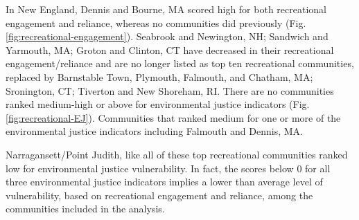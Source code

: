 \documentclass[
  10pt,
]{article}
\begin{document}
In New England, Dennis and Bourne, MA scored high for both recreational engagement and reliance, whereas no communities did previously (Fig. \ref{fig:recreational-engagement}). Seabrook and Newington, NH; Sandwich and Yarmouth, MA; Groton and Clinton, CT have decreased in their recreational engagement/reliance and are no longer listed as top ten recreational communities, replaced by Barnstable Town, Plymouth, Falmouth, and Chatham, MA; Sronington, CT; Tiverton and New Shoreham, RI. There are no communities ranked medium-high or above for environmental justice indicators (Fig. \ref{fig:recreational-EJ}). Communities that ranked medium for one or more of the environmental justice indicators including Falmouth and Dennis, MA.

Narragansett/Point Judith, like all of these top recreational communities ranked low for environmental justice vulnerability. In fact, the scores below 0 for all three environmental justice indicators implies a lower than average level of vulnerability, based on recreational engagement and reliance, among the communities included in the analysis.
\end{document}
